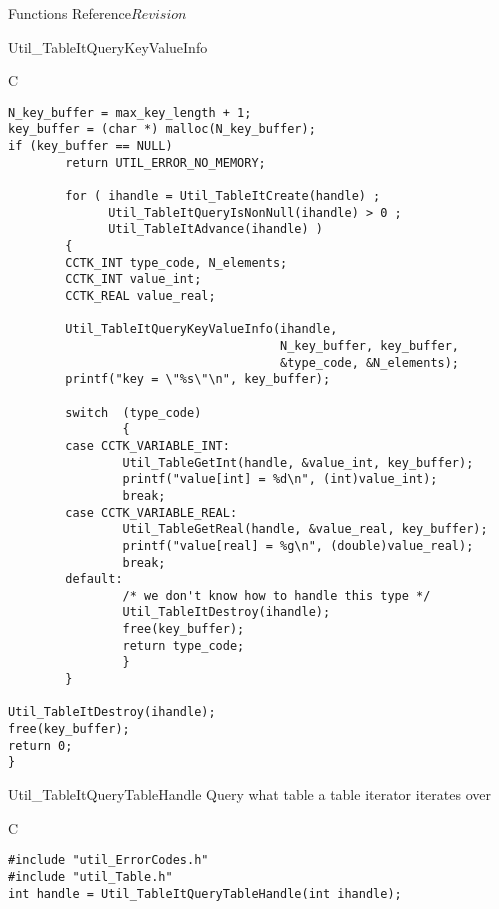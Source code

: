 \begin{cactuspart}{ Functions Reference}{}{$Revision$}
\begin{FunctionDescription}{Util\_TableItQueryKeyValueInfo}
\begin{ExampleSection}
\begin{Example}{C}
\begin{verbatim}
N_key_buffer = max_key_length + 1;
key_buffer = (char *) malloc(N_key_buffer);
if (key_buffer == NULL)
        return UTIL_ERROR_NO_MEMORY;

        for ( ihandle = Util_TableItCreate(handle) ;
              Util_TableItQueryIsNonNull(ihandle) > 0 ;
              Util_TableItAdvance(ihandle) )
        {
        CCTK_INT type_code, N_elements;
        CCTK_INT value_int;
        CCTK_REAL value_real;

        Util_TableItQueryKeyValueInfo(ihandle,
                                      N_key_buffer, key_buffer,
                                      &type_code, &N_elements);
        printf("key = \"%s\"\n", key_buffer);

        switch  (type_code)
                {
        case CCTK_VARIABLE_INT:
                Util_TableGetInt(handle, &value_int, key_buffer);
                printf("value[int] = %d\n", (int)value_int);
                break;
        case CCTK_VARIABLE_REAL:
                Util_TableGetReal(handle, &value_real, key_buffer);
                printf("value[real] = %g\n", (double)value_real);
                break;
        default:
                /* we don't know how to handle this type */
                Util_TableItDestroy(ihandle);
                free(key_buffer);
                return type_code;
                }
        }

Util_TableItDestroy(ihandle);
free(key_buffer);
return 0;
}
\end{verbatim}
\end{Example}
\end{ExampleSection}
\end{FunctionDescription}


\begin{FunctionDescription}{Util\_TableItQueryTableHandle}
\label{Util-TableItQueryTableHandle}
Query what table a table iterator iterates over

\begin{SynopsisSection}
\begin{Synopsis}{C}
\begin{verbatim}
#include "util_ErrorCodes.h"
#include "util_Table.h"
int handle = Util_TableItQueryTableHandle(int ihandle);
\end{verbatim}
\end{Synopsis}
\end{SynopsisSection}


\end{FunctionDescription}
\end{cactuspart}
